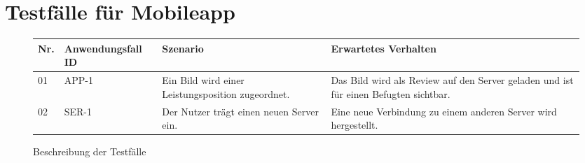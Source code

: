 \newpage
\section{Testfälle für Mobileapp}

\begin{figure}[!h]
	\begin{center}
		\begin{tabularx}{\textwidth}{ p{} | p{} | p{} | X }
			\textbf{Nr.} & \textbf{Anwendungsfall ID} & \textbf{Szenario} & \textbf{Erwartetes Verhalten} \\ \hline
			01 & APP-1 & Ein Bild wird einer Leistungsposition zugeordnet. & Das Bild wird als Review auf den Server geladen und ist für einen Befugten sichtbar. \\ \hline
			02 & SER-1 & Der Nutzer trägt einen neuen Server ein. & Eine neue Verbindung zu einem anderen Server wird hergestellt. \\ \hline
		\end{tabularx}	
	\end{center}
	\caption{Beschreibung der Testfälle}
	\label{fig:testfaelle-mobile-app-tabelle}
\end{figure}